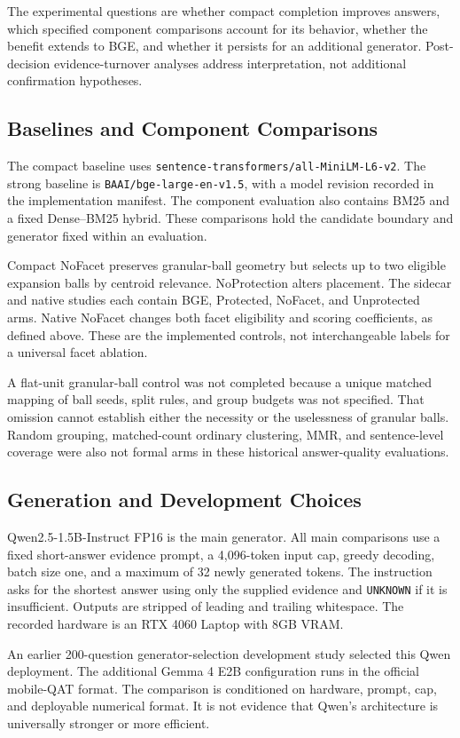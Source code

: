 \documentclass[11pt,a4paper]{article}
\begin{document}
The experimental questions are whether compact completion improves answers,
which specified component comparisons account for its behavior, whether the
benefit extends to BGE, and whether it persists for an additional generator.
Post-decision evidence-turnover analyses address interpretation, not additional
confirmation hypotheses.

\subsection{Baselines and Component Comparisons}
The compact baseline uses \texttt{sentence-transformers/all-MiniLM-L6-v2}.
The strong baseline is \texttt{BAAI/bge-large-en-v1.5}, with a model revision
recorded in the implementation manifest. The component evaluation also
contains BM25 and a fixed Dense--BM25 hybrid. These comparisons hold the
candidate boundary and generator fixed within an evaluation.

Compact NoFacet preserves granular-ball geometry but selects up to two
eligible expansion balls by centroid relevance. NoProtection alters placement.
The sidecar and native studies each contain BGE, Protected, NoFacet, and
Unprotected arms. Native NoFacet changes both facet eligibility and scoring
coefficients, as defined above. These are the implemented controls, not
interchangeable labels for a universal facet ablation.

A flat-unit granular-ball control was not completed because a unique matched
mapping of ball seeds, split rules, and group budgets was not specified.
That omission cannot establish either the necessity or the uselessness of
granular balls. Random grouping, matched-count ordinary clustering, MMR,
and sentence-level coverage were also not formal arms in these historical
answer-quality evaluations.

\subsection{Generation and Development Choices}
Qwen2.5-1.5B-Instruct FP16 is the main generator. All main comparisons use a
fixed short-answer evidence prompt, a 4,096-token input cap, greedy decoding,
batch size one, and a maximum of 32 newly generated tokens. The instruction
asks for the shortest answer using only the supplied evidence and
\texttt{UNKNOWN} if it is insufficient. Outputs are stripped of leading and
trailing whitespace. The recorded hardware is an RTX 4060 Laptop with 8GB
VRAM.

An earlier 200-question generator-selection development study selected this
Qwen deployment. The additional Gemma 4 E2B configuration runs in the official
mobile-QAT format. The comparison is conditioned on hardware, prompt, cap,
and deployable numerical format. It is not evidence that Qwen's architecture
is universally stronger or more efficient.
\end{document}
